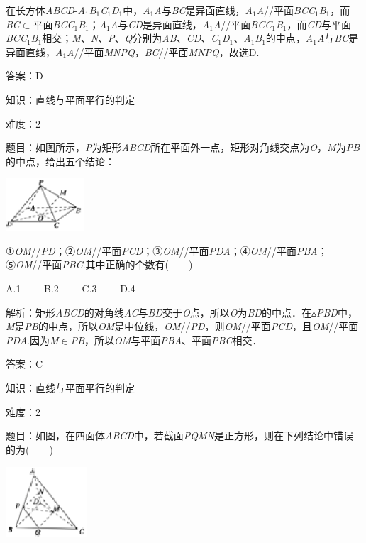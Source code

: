\documentclass{article} %
\begin{document}
在长方体\textit{ABCD}-\textit{A}${}_{1}$\textit{B}${}_{1}$\textit{C}${}_{1}$\textit{D}${}_{1}$中，\textit{A}${}_{1}$\textit{A}与\textit{BC}是异面直线，\textit{A}${}_{1}$\textit{A}//平面\textit{BCC}${}_{1}$\textit{B}${}_{1}$，而\textit{BC}$\mathrm{\subset }$平面\textit{BCC}${}_{1}$\textit{B}${}_{1}$；\textit{A}${}_{1}$\textit{A}与\textit{CD}是异面直线，\textit{A}${}_{1}$\textit{A}//平面\textit{BCC}${}_{1}$\textit{B}${}_{1}$，而\textit{CD}与平面\textit{BCC}${}_{1}$\textit{B}${}_{1}$相交；\textit{M}、\textit{N}、\textit{P}、\textit{Q}分别为\textit{AB}、\textit{CD}、\textit{C}${}_{1}$\textit{D}${}_{1}$、\textit{A}${}_{1}$\textit{B}${}_{1}$的中点，\textit{A}${}_{1}$\textit{A}与\textit{BC}是异面直线，\textit{A}${}_{1}$\textit{A}//平面\textit{MNPQ}，\textit{BC}//平面\textit{MNPQ}，故选D.

答案：D

知识：直线与平面平行的判定

难度：2

题目：如图所示，\textit{P}为矩形\textit{ABCD}所在平面外一点，矩形对角线交点为\textit{O}，\textit{M}为\textit{PB}的中点，给出五个结论：

\includegraphics*[width=1.16in, height=0.77in, keepaspectratio=false]{image137}

①\textit{OM}//\textit{PD}；②\textit{OM}//平面\textit{PCD}；③\textit{OM}//平面\textit{PDA}；④\textit{OM}//平面\textit{PBA}；⑤\textit{OM}//平面\textit{PBC}.其中正确的个数有(　　)

A.1　　 B.2　　 C.3　　 D.4

解析：矩形\textit{ABCD}的对角线\textit{AC}与\textit{BD}交于\textit{O}点，所以\textit{O}为\textit{BD}的中点．在$\mathrm{\vartriangle}$\textit{PBD}中，\textit{M}是\textit{PB}的中点，所以\textit{OM}是中位线，\textit{OM}//\textit{PD}，则\textit{OM}//平面\textit{PCD}，且\textit{OM}//平面\textit{PDA}.因为\textit{M}$\mathrm{\in}$\textit{PB}，所以\textit{OM}与平面\textit{PBA}、平面\textit{PBC}相交．

答案：C

知识：直线与平面平行的判定

难度：2

题目：如图，在四面体\textit{ABCD}中，若截面\textit{PQMN}是正方形，则在下列结论中错误的为(　　)

\includegraphics*[width=1.19in, height=1.05in, keepaspectratio=false]{image138}
\end{document}

